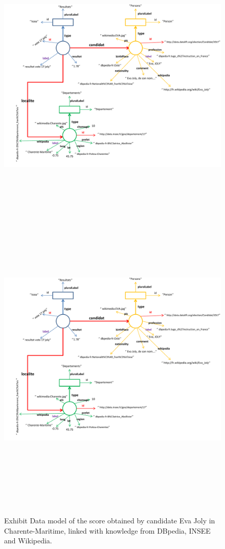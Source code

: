 \documentclass[a4paper,11pt]{report}
\begin{document}
\begin{landscape}
\begin{figure}[!htbp]
  \begin{center}
    \ifpdf
      \includegraphics[height=5in]{model_EvaJoly_data}
    \else
      \includegraphics[bb = 92 86 545 742, height=6in]{model_EvaJoly_data}
    \fi
    \caption{Exhibit Data model of the score obtained by candidate Eva Joly in Charente-Maritime, linked with knowledge from DBpedia, INSEE and Wikipedia. }
    \label{sampleModel}
  \end{center}
\end{figure}
\end{landscape}
\end{document}
